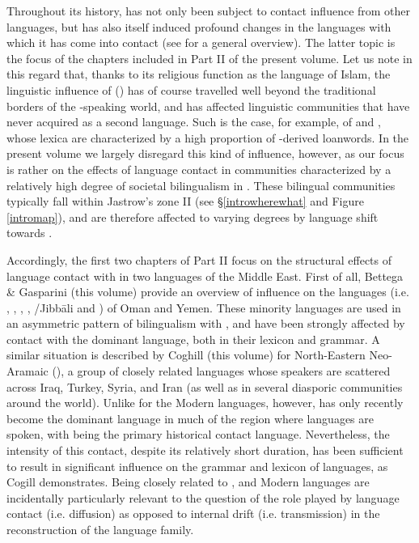 \documentclass[output=paper]{langsci/langscibook}
\begin{document}
Throughout its history,  has not only been subject to contact influence from other languages, but has also itself induced profound changes in the languages with which it has come into contact (see \citealt{Versteegh2001article} for a general overview). The latter topic is the focus of the chapters included in Part II of the present volume. Let us note in this regard that, thanks to its religious function as the language of Islam, the linguistic influence of ()  has of course travelled well beyond the traditional borders of the -speaking world, and has affected linguistic communities that have never acquired  as a second language. Such is the case, for example, of  and , whose lexica are characterized by a high proportion of -derived {loanwords}. In the present volume we largely disregard this kind of influence, however, as our focus is rather on the effects of language contact in communities characterized by a relatively high degree of societal {bilingualism} in . These bilingual communities typically fall within Jastrow’s zone II (see §\ref{introwherewhat} and Figure \ref{intromap}), and are therefore affected to varying degrees by {language shift} towards .

Accordingly, the first two chapters of Part II focus on the structural effects of language contact with  in two  languages of the Middle East. First of all, Bettega \& Gasparini (this volume) provide an overview of  influence on the  languages (i.e. , , , , /Jibbāli and ) of {Oman} and {Yemen}. These minority languages are used in an asymmetric pattern of {bilingualism} with , and have been strongly affected by contact with the dominant language, both in their lexicon and grammar. A similar situation is described by Coghill (this volume) for North-Eastern Neo-Aramaic (), a group of closely related languages whose speakers are scattered across Iraq, Turkey, Syria, and Iran (as well as in several diasporic communities around the world). Unlike for the Modern  languages, however,  has only recently become the dominant language in much of the region where  languages are spoken, with  being the primary historical contact language. Nevertheless, the intensity of this contact, despite its relatively short duration, has been sufficient to result in significant influence on the grammar and lexicon of  languages, as Cogill demonstrates. Being closely related to ,  and Modern  languages are incidentally particularly relevant to the question of the role played by language contact (i.e. {diffusion}) as opposed to internal drift (i.e. {transmission}) in the reconstruction of the  language family.
\end{document}
